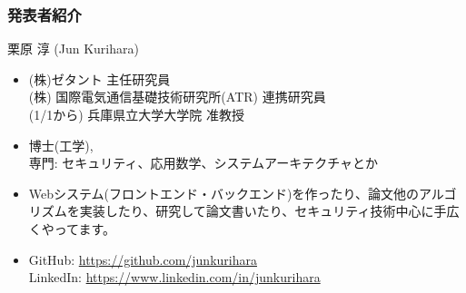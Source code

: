 \begin{frame}
\frametitle{発表者紹介}
{\Large 栗原 淳 (Jun Kurihara)}
\begin{itemize}
 \item (株)ゼタント 主任研究員\\
(株) 国際電気通信基礎技術研究所(ATR) 連携研究員\\
(1/1から) 兵庫県立大学大学院 准教授
 \item 博士(工学), \\
 専門: セキュリティ、応用数学、システムアーキテクチャとか
 \item  Webシステム(フロントエンド・バックエンド)を作ったり、論文他のアルゴリズムを実装したり、研究して論文書いたり、セキュリティ技術中心に手広くやってます。
 \item GitHub: \url{https://github.com/junkurihara}\\
LinkedIn: \url{https://www.linkedin.com/in/junkurihara}
\end{itemize}
\end{frame}